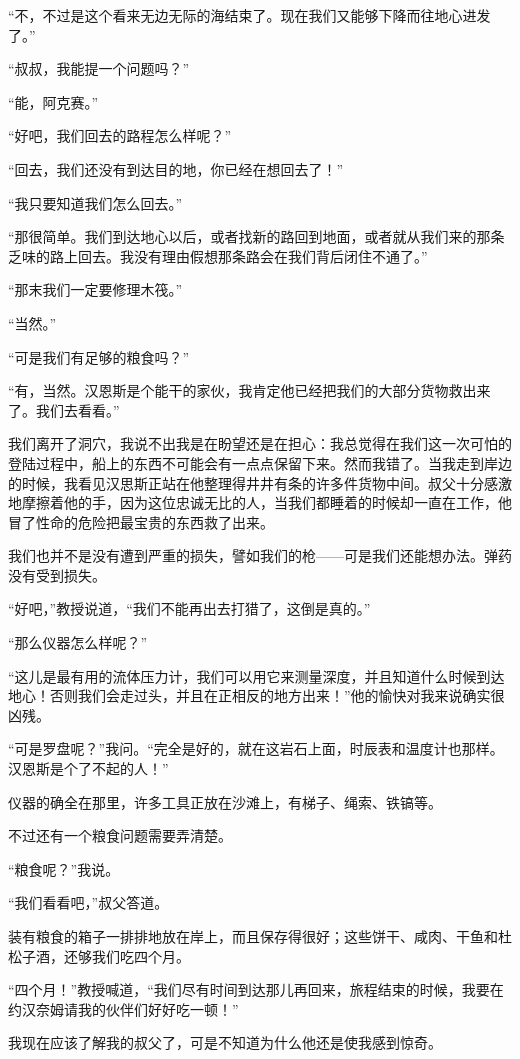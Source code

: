 \documentclass[10pt]{book}
\begin{document}
“不，不过是这个看来无边无际的海结束了。现在我们又能够下降而往地心进发了。”

“叔叔，我能提一个问题吗？”

“能，阿克赛。”

“好吧，我们回去的路程怎么样呢？”

“回去，我们还没有到达目的地，你已经在想回去了！”

“我只要知道我们怎么回去。”

“那很简单。我们到达地心以后，或者找新的路回到地面，或者就从我们来的那条乏味的路上回去。我没有理由假想那条路会在我们背后闭住不通了。”

“那末我们一定要修理木筏。”

“当然。”

“可是我们有足够的粮食吗？”

“有，当然。汉恩斯是个能干的家伙，我肯定他已经把我们的大部分货物救出来了。我们去看看。”

我们离开了洞穴，我说不出我是在盼望还是在担心：我总觉得在我们这一次可怕的登陆过程中，船上的东西不可能会有一点点保留下来。然而我错了。当我走到岸边的时候，我看见汉思斯正站在他整理得井井有条的许多件货物中间。叔父十分感激地摩擦着他的手，因为这位忠诚无比的人，当我们都睡着的时候却一直在工作，他冒了性命的危险把最宝贵的东西救了出来。

我们也并不是没有遭到严重的损失，譬如我们的枪——可是我们还能想办法。弹药没有受到损失。

“好吧，”教授说道，“我们不能再出去打猎了，这倒是真的。”

“那么仪器怎么样呢？”

“这儿是最有用的流体压力计，我们可以用它来测量深度，并且知道什么时候到达地心！否则我们会走过头，并且在正相反的地方出来！”他的愉快对我来说确实很凶残。

“可是罗盘呢？”我问。“完全是好的，就在这岩石上面，时辰表和温度计也那样。汉恩斯是个了不起的人！”

仪器的确全在那里，许多工具正放在沙滩上，有梯子、绳索、铁镐等。

不过还有一个粮食问题需要弄清楚。

“粮食呢？”我说。

“我们看看吧，”叔父答道。

装有粮食的箱子一排排地放在岸上，而且保存得很好；这些饼干、咸肉、干鱼和杜松子酒，还够我们吃四个月。

“四个月！”教授喊道，“我们尽有时间到达那儿再回来，旅程结束的时候，我要在约汉奈姆请我的伙伴们好好吃一顿！”

我现在应该了解我的叔父了，可是不知道为什么他还是使我感到惊奇。
\end{document}
